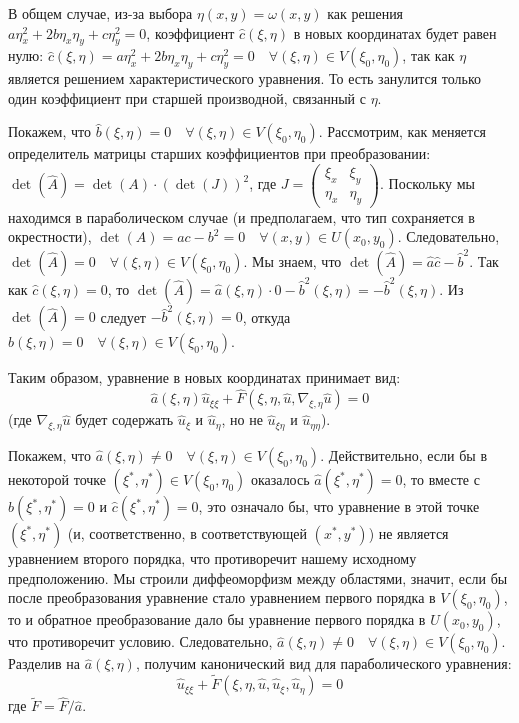 \documentclass[12pt, a4paper]{article}
\begin{document}
В общем случае, из-за выбора $\eta(x,y)=\omega(x,y)$ как решения $a\eta_x^2 + 2b\eta_x\eta_y + c\eta_y^2 = 0$, коэффициент $\hat{c}(\xi,\eta)$ в новых координатах будет равен нулю:
$\hat{c}(\xi,\eta) = a\eta_x^2 + 2b\eta_x\eta_y + c\eta_y^2 = 0 \quad \forall (\xi,\eta) \in V(\xi_0,\eta_0)$,
так как $\eta$ является решением характеристического уравнения.
То есть занулится только один коэффициент при старшей производной, связанный с $\eta$.

Покажем, что $\hat{b}(\xi,\eta) = 0 \quad \forall (\xi,\eta) \in V(\xi_0,\eta_0)$.
Рассмотрим, как меняется определитель матрицы старших коэффициентов при преобразовании:
$\det(\hat{A}) = \det(A) \cdot (\det(J))^2$, где $J = \begin{pmatrix} \xi_x & \xi_y \\ \eta_x & \eta_y \end{pmatrix}$.
Поскольку мы находимся в параболическом случае (и предполагаем, что тип сохраняется в окрестности), $\det(A) = ac-b^2 = 0 \quad \forall (x,y) \in U(x_0,y_0)$.
Следовательно, $\det(\hat{A}) = 0 \quad \forall (\xi,\eta) \in V(\xi_0,\eta_0)$.
Мы знаем, что $\det(\hat{A}) = \hat{a}\hat{c} - \hat{b}^2$.
Так как $\hat{c}(\xi,\eta)=0$, то $\det(\hat{A}) = \hat{a}(\xi,\eta) \cdot 0 - \hat{b}^2(\xi,\eta) = -\hat{b}^2(\xi,\eta)$.
Из $\det(\hat{A})=0$ следует $-\hat{b}^2(\xi,\eta) = 0$, откуда $\hat{b}(\xi,\eta) = 0 \quad \forall (\xi,\eta) \in V(\xi_0,\eta_0)$.

Таким образом, уравнение в новых координатах принимает вид:
\[ \hat{a}(\xi,\eta)\hat{u}_{\xi\xi} + \hat{F}(\xi,\eta,\hat{u},\nabla_{\xi,\eta}\hat{u}) = 0 \]
(где $\nabla_{\xi,\eta}\hat{u}$ будет содержать $\hat{u}_\xi$ и $\hat{u}_\eta$, но не $\hat{u}_{\xi\eta}$ и $\hat{u}_{\eta\eta}$).

Покажем, что $\hat{a}(\xi,\eta) \neq 0 \quad \forall (\xi,\eta) \in V(\xi_0,\eta_0)$.
Действительно, если бы в некоторой точке $(\xi^*,\eta^*) \in V(\xi_0,\eta_0)$ оказалось $\hat{a}(\xi^*,\eta^*)=0$, то вместе с $\hat{b}(\xi^*,\eta^*)=0$ и $\hat{c}(\xi^*,\eta^*)=0$, это означало бы, что уравнение в этой точке $(\xi^*,\eta^*)$ (и, соответственно, в соответствующей $(x^*,y^*)$) не является уравнением второго порядка, что противоречит нашему исходному предположению.
Мы строили диффеоморфизм между областями, значит, если бы после преобразования уравнение стало уравнением первого порядка в $V(\xi_0,\eta_0)$, то и обратное преобразование дало бы уравнение первого порядка в $U(x_0,y_0)$, что противоречит условию.
Следовательно, $\hat{a}(\xi,\eta) \neq 0 \quad \forall (\xi,\eta) \in V(\xi_0,\eta_0)$.
Разделив на $\hat{a}(\xi,\eta)$, получим канонический вид для параболического уравнения:
\begin{equation} \label{eq:parabolic_canonical}
\hat{u}_{\xi\xi} + \tilde{F}(\xi,\eta,\hat{u},\hat{u}_\xi,\hat{u}_\eta) = 0
\end{equation}
где $\tilde{F} = \hat{F}/\hat{a}$.
\end{document}
